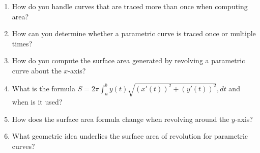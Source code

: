 \begin{enumerate}
  \item How do you handle curves that are traced more than once when computing area?
  \item How can you determine whether a parametric curve is traced once or multiple times?
  \item How do you compute the surface area generated by revolving a parametric curve about the $x$-axis?
  \item What is the formula $S = 2\pi \int_a^b y(t)\sqrt{(x'(t))^2 + (y'(t))^2},dt$ and when is it used?
  \item How does the surface area formula change when revolving around the $y$-axis?
  \item What geometric idea underlies the surface area of revolution for parametric curves?
\end{enumerate}
